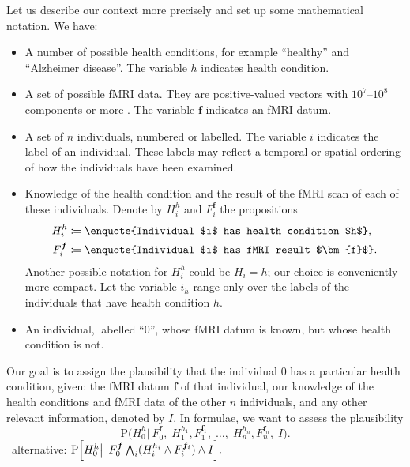 \documentclass[\ifafour a4paper,12pt,\else a5paper,10pt,\fi%
onecolumn,oneside,article,%
british%
]{memoir}
\theoremstyle{remark}
\theoremstyle{innote}
\newcommand*{\citep}{\parencites}
\newcommand*{\defd}{\coloneqq}
\newcommand*{\Land}{\bigwedge}
\newcommand*{\p}{\mathrm{P}}%
\renewcommand*{\|}{\mathpunct{|}}
\newcommand*{\bigcond}{\mathpunct{\big|\ }}%
\newcommand*{\sland}{\mathop{\textstyle\bigwedge}}
\newcommand*{\puzzle}{\maltese}
\newcommand{\mynote}[1]{ {\footnotesize\color{notecolour}\puzzle\ #1} }
\newcommand*{\yH}{H}
\newcommand*{\yh}{h}
\newcommand*{\yF}{F}
\newcommand*{\yf}{\bm{f}}
\newcommand*{\yih}{i_{\yh}}
\newcommand*{\yihb}{i_{\yh'}}
\newcommand*{\yn}{n}
\newcommand*{\yI}{I}
\theoremstyle{plain}
\begin{document}
Let us describe our context more precisely and set up some mathematical
notation. We have:
\begin{itemize}[para]
\item A number of possible health conditions, for example \enquote{healthy}
  and \enquote{Alzheimer disease}. The variable $\yh$ indicates health
  condition.

\item A set of possible fMRI data. They are positive-valued vectors with
  $10^7$--$10^8$ components or more \citep{lindquist2008}. The variable
  $\yf$ indicates an fMRI datum.

\item A set of $\yn$ individuals, numbered or labelled. The variable $i$
  indicates the label of an individual. These labels may reflect a temporal
  or spatial ordering of how the individuals have been examined.

\item Knowledge of the health condition and the result of the fMRI scan of
  each of these individuals. Denote by $\yH_i^{\yh}$ and $\yF_i^{\yf}$ the propositions
  \begin{align}
    \label{eq:prop_health}
    \yH_i^{\yh} &\defd \text{\enquote{Individual $i$ has health condition $\yh$}},
    \\
    \label{eq:prop_fmri}
    \yF_i^{\yf} &\defd \text{\enquote{Individual $i$ has fMRI result $\yf$}}.  
  \end{align}
  Another possible notation for $\yH_i^{\yh}$ could be $\yH_i = \yh$; our
  choice is conveniently more compact. Let the variable $\yih$ range only
  over the labels of the individuals that have health condition $\yh$.

\item An individual, labelled \enquote{$0$}, whose fMRI datum is known, but
  whose health condition is not.
\end{itemize}

Our goal is to assign the plausibility that the individual $0$ has a
particular health condition, given: the fMRI datum $\yf$ of that
individual, our knowledge of the health conditions and fMRI data of the
other $\yn$ individuals, and any other relevant information, denoted by
$\yI$. In formulae, we want to assess the plausibility
\begin{equation}
  \label{eq:goal_1st}
  \p\bigl( \yH_0^{\yh} \bigcond \yF_0^{\yf},\;
  \yH_1^{\yh_1}, \yF_1^{\yf_1},\;
  \dotsc,\;
  \yH_{\yn}^{\yh_{\yn}}, \yF_{\yn}^{\yf_{\yn}},\;
  \yI \bigr).
\end{equation}
\mynote{alternative: $\p\Bigl[\yH_0^{\yh} \bigcond \yF_0^{\yf}
  \sland_{i} (\yH_{i}^{\yh_{i}} \land \yF_{i}^{\yf_{i}})
  \land \yI \Bigr].$}
\end{document}
